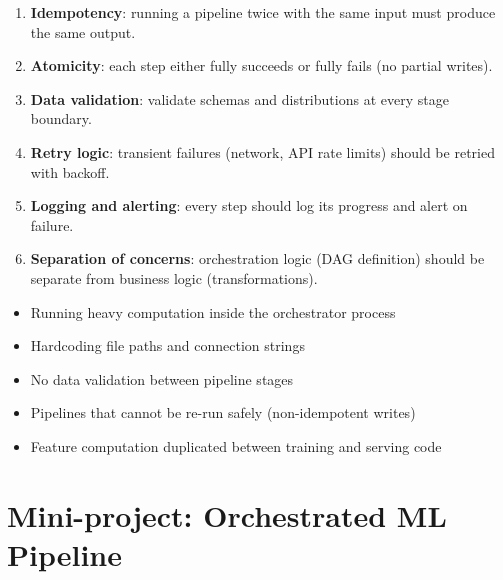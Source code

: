 \begin{bestpractice}[title=\textbf{Pipeline design golden rules}]
\begin{enumerate}
  \item \textbf{Idempotency}: running a pipeline twice with the same input
    must produce the same output.
  \item \textbf{Atomicity}: each step either fully succeeds or fully fails
    (no partial writes).
  \item \textbf{Data validation}: validate schemas and distributions at
    every stage boundary.
  \item \textbf{Retry logic}: transient failures (network, API rate limits)
    should be retried with backoff.
  \item \textbf{Logging and alerting}: every step should log its progress
    and alert on failure.
  \item \textbf{Separation of concerns}: orchestration logic (DAG
    definition) should be separate from business logic (transformations).
\end{enumerate}
\end{bestpractice}

\begin{antipattern}[title=\textbf{Pipeline anti-patterns}]
\begin{itemize}
  \item Running heavy computation inside the orchestrator process
  \item Hardcoding file paths and connection strings
  \item No data validation between pipeline stages
  \item Pipelines that cannot be re-run safely (non-idempotent writes)
  \item Feature computation duplicated between training and serving code
\end{itemize}
\end{antipattern}

\section{Mini-project: Orchestrated ML Pipeline}
\label{sec:mini-project-ch5}


